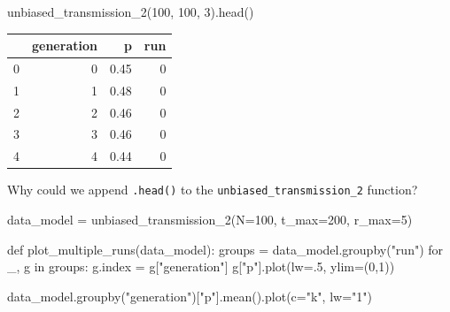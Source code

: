 \documentclass[
  a4paperpaper,
  ,captions=tableheading
]{scrbook}
\newenvironment{Shaded}{\begin{snugshade}}{\end{snugshade}}
\newcommand{\ControlFlowTok}[1]{\textcolor[rgb]{0.00,0.23,0.31}{#1}}
\newcommand{\DecValTok}[1]{\textcolor[rgb]{0.68,0.00,0.00}{#1}}
\newcommand{\FloatTok}[1]{\textcolor[rgb]{0.68,0.00,0.00}{#1}}
\newcommand{\KeywordTok}[1]{\textcolor[rgb]{0.00,0.23,0.31}{#1}}
\newcommand{\NormalTok}[1]{\textcolor[rgb]{0.00,0.23,0.31}{#1}}
\newcommand{\OperatorTok}[1]{\textcolor[rgb]{0.37,0.37,0.37}{#1}}
\newcommand{\StringTok}[1]{\textcolor[rgb]{0.13,0.47,0.30}{#1}}
\begin{document}
\begin{Shaded}
\begin{Highlighting}[]
\NormalTok{unbiased\_transmission\_2(}\DecValTok{100}\NormalTok{, }\DecValTok{100}\NormalTok{, }\DecValTok{3}\NormalTok{).head()}
\end{Highlighting}
\end{Shaded}

\begin{tabular}{lrrr}
\toprule
{} &  generation &     p &  run \\
\midrule
0 &           0 &  0.45 &    0 \\
1 &           1 &  0.48 &    0 \\
2 &           2 &  0.46 &    0 \\
3 &           3 &  0.46 &    0 \\
4 &           4 &  0.44 &    0 \\
\bottomrule
\end{tabular}

\begin{tcolorbox}[enhanced jigsaw, arc=.35mm, colbacktitle=quarto-callout-tip-color!10!white, colback=white, breakable, toprule=.15mm, title=\textcolor{quarto-callout-tip-color}{\faLightbulb}\hspace{0.5em}{Tip}, left=2mm, bottomtitle=1mm, toptitle=1mm, leftrule=.75mm, opacitybacktitle=0.6, titlerule=0mm, opacityback=0, rightrule=.15mm, bottomrule=.15mm, coltitle=black, colframe=quarto-callout-tip-color-frame]

Why could we append \texttt{.head()} to the
\texttt{unbiased\_transmission\_2} function?

\end{tcolorbox}

\begin{Shaded}
\begin{Highlighting}[]
\NormalTok{data\_model }\OperatorTok{=}\NormalTok{ unbiased\_transmission\_2(N}\OperatorTok{=}\DecValTok{100}\NormalTok{, t\_max}\OperatorTok{=}\DecValTok{200}\NormalTok{, r\_max}\OperatorTok{=}\DecValTok{5}\NormalTok{)}
\end{Highlighting}
\end{Shaded}

\begin{Shaded}
\begin{Highlighting}[]
\KeywordTok{def}\NormalTok{ plot\_multiple\_runs(data\_model):}
\NormalTok{    groups }\OperatorTok{=}\NormalTok{ data\_model.groupby(}\StringTok{"run"}\NormalTok{)}
    \ControlFlowTok{for}\NormalTok{ \_, g }\KeywordTok{in}\NormalTok{ groups:}
\NormalTok{        g.index }\OperatorTok{=}\NormalTok{ g[}\StringTok{"generation"}\NormalTok{]}
\NormalTok{        g[}\StringTok{"p"}\NormalTok{].plot(lw}\OperatorTok{=}\FloatTok{.5}\NormalTok{, ylim}\OperatorTok{=}\NormalTok{(}\DecValTok{0}\NormalTok{,}\DecValTok{1}\NormalTok{))}

\NormalTok{    data\_model.groupby(}\StringTok{"generation"}\NormalTok{)[}\StringTok{"p"}\NormalTok{].mean().plot(c}\OperatorTok{=}\StringTok{"k"}\NormalTok{, lw}\OperatorTok{=}\StringTok{"1"}\NormalTok{)}
\end{Highlighting}
\end{Shaded}
\end{document}
